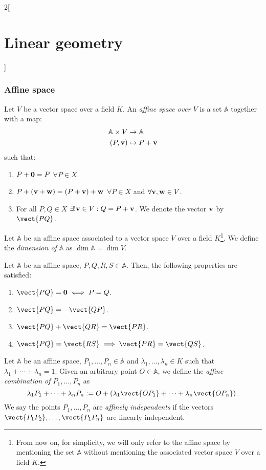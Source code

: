 \documentclass[../../../main.tex]{subfiles}
\begin{document}
\begin{multicols}{2}[\section{Linear geometry}]
    \subsubsection{Affine space}
    \begin{definition}
        Let $V$ be a vector space over a field $K$. An \textit{affine space over $V$} is a set $\mathbb{A}$ together with a map:
        \begin{align*}
            \mathbb{A}\times V & \rightarrow \mathbb{A} \\
            (P,\boldsymbol{\mathrm{v}})         & \mapsto P+\boldsymbol{\mathrm{v}}
        \end{align*}
        such that:
        \begin{enumerate}
            \item $P+\boldsymbol{\mathrm{0}}=P$ $\forall P\in X$.
            \item $P+(\boldsymbol{\mathrm{v}}+\boldsymbol{\mathrm{w}})=(P+\boldsymbol{\mathrm{v}})+\boldsymbol{\mathrm{w}}$ $\forall P\in X$ and $\forall\boldsymbol{\mathrm{v}},\boldsymbol{\mathrm{w}}\in V$.
            \item For all $P,Q\in X$ $\exists!\boldsymbol{\mathrm{v}}\in V:Q=P+\boldsymbol{\mathrm{v}}$. We denote the vector $\boldsymbol{\mathrm{v}}$ by $\vect{PQ}$.
        \end{enumerate}
    \end{definition}
    \begin{definition}
        Let $\mathbb{A}$ be an affine space associated to a vector space $V$ over a field $K$\footnote{From now on, for simplicity, we will only refer to the affine space by mentioning the set $\mathbb{A}$ without mentioning the associated vector space $V$ over a field $K$.}. We define the \textit{dimension of $\mathbb{A}$} as $\dim\mathbb{A}=\dim V$.
    \end{definition}
    \begin{prop}
        Let $\mathbb{A}$ be an affine space, $P,Q,R,S\in\mathbb{A}$. Then, the following properties are satisfied:
        \begin{enumerate}
            \item $\vect{PQ}=\vf{0}\iff P=Q$.
            \item $\vect{PQ}=-\vect{QP}$.
            \item $\vect{PQ}+\vect{QR}=\vect{PR}$.
            \item $\vect{PQ}=\vect{RS}\implies\vect{PR}=\vect{QS}$.
        \end{enumerate}
    \end{prop}
    \begin{definition}
        Let $\mathbb{A}$ be an affine space, $P_1,\ldots,P_n\in\mathbb{A}$ and $\lambda_1,\ldots,\lambda_n\in K$ such that $\lambda_1+\cdots+\lambda_n=1$. Given an arbitrary point $O\in\mathbb{A}$, we define the \textit{affine combination of $P_1,\ldots,P_n$} as $$\lambda_1P_1+\cdots+\lambda_nP_n:=O+\left(\lambda_1\vect{OP_1}+\cdots+\lambda_n\vect{OP_n}\right).$$ We say the points $P_1,\ldots,P_n$ are \textit{affinely independents} if the vectors $\vect{P_1P_2},\ldots,\vect{P_1P_n}$ are linearly independent.

\end{definition}
\end{multicols}
\end{document}
